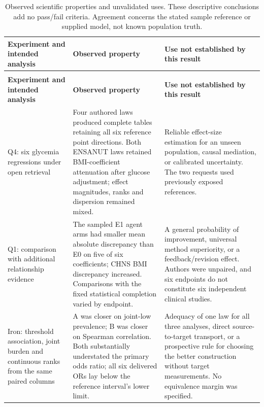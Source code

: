 \documentclass[11pt,letterpaper]{article}
\begin{document}
\begin{xltabular}{\linewidth}{@{}>{\raggedright\arraybackslash}X>{\raggedright\arraybackslash}X>{\raggedright\arraybackslash}X@{}}

\caption{Observed scientific properties and unvalidated uses. These descriptive conclusions add no pass/\allowbreak{}fail criteria. Agreement concerns the stated sample reference or supplied model, not known population truth.}\label{tab:5} \\

\toprule

\textbf{Experiment and intended analysis} & \textbf{Observed property} & \textbf{Use not established by this result} \\

\midrule

\endfirsthead

\\

\toprule

\textbf{Experiment and intended analysis} & \textbf{Observed property} & \textbf{Use not established by this result} \\

\midrule

\endhead

\bottomrule

\endfoot

Q4: six glycemia regressions under open retrieval & Four authored laws produced complete tables retaining all six reference point directions. Both ENSANUT laws retained BMI-coefficient attenuation after glucose adjustment; effect magnitudes, ranks and dispersion remained mixed. & Reliable effect-size estimation for an unseen population, causal mediation, or calibrated uncertainty. The two requests used previously exposed references. \\

Q1: comparison with additional relationship evidence & The sampled E1 agent arms had smaller mean absolute discrepancy than E0 on five of six coefficients; CHNS BMI discrepancy increased. Comparisons with the fixed statistical completion varied by endpoint. & A general probability of improvement, universal method superiority, or a feedback/\allowbreak{}revision effect. Authors were unpaired, and six endpoints do not constitute six independent clinical studies. \\

Iron: threshold association, joint burden and continuous ranks from the same paired columns & A was closer on joint-low prevalence; B was closer on Spearman correlation. Both substantially understated the primary odds ratio; all six delivered ORs lay below the reference interval's lower limit. & Adequacy of one law for all three analyses, direct source-to-target transport, or a prospective rule for choosing the better construction without target measurements. No equivalence margin was specified. \\


\end{xltabular}
\end{document}
